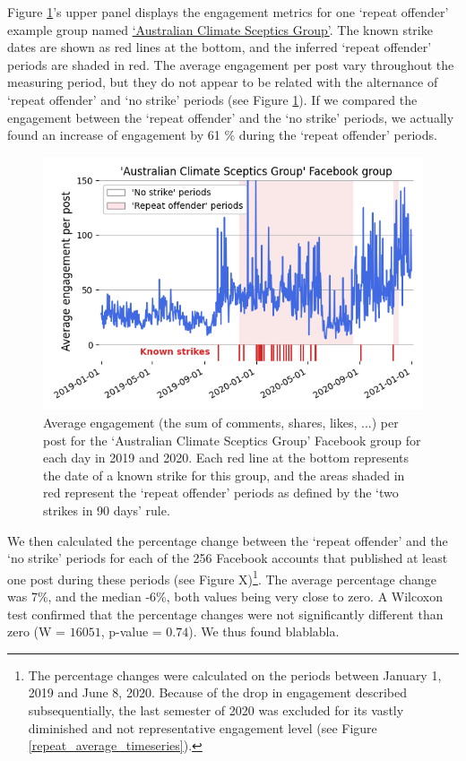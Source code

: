\documentclass[11pt,a4paper]{article}
\begin{document}
Figure \ref{repeat_example_timeseries}'s upper panel displays the engagement metrics for one `repeat offender' example group named \href{https://www.facebook.com/groups/108655705888371/}{`Australian Climate Sceptics Group'}. 
The known strike dates are shown as red lines at the bottom, and the inferred ‘repeat offender’ periods are shaded in red. 
The average engagement per post vary throughout the measuring period, but they do not appear to be related with the alternance of `repeat offender' and `no strike' periods (see Figure \ref{repeat_example_timeseries}).
If we compared the engagement between the `repeat offender' and the `no strike' periods, we actually found an increase of engagement by 61 \% during the `repeat offender' periods.

\begin{figure}[!h]
\centering
\includegraphics[width=\linewidth]{./../figure/repeat_example_timeseries.png}
\caption{Average engagement (the sum of comments, shares, likes, ...) per post for the `Australian Climate Sceptics Group' Facebook group for each day in 2019 and 2020. Each red line at the bottom represents the date of a known strike for this group, and the areas shaded in red represent the `repeat offender' periods as defined by the ‘two strikes in 90 days’ rule.}
\label{repeat_example_timeseries}
\end{figure}

We then calculated the percentage change between the `repeat offender' and the `no strike' periods for each of the 256 Facebook accounts that published at least one post during these periods ({\color{red}see Figure X})\footnote{The percentage changes were calculated on the periods between January 1, 2019 and June 8, 2020. Because of the drop in engagement described subsequentially, the last semester of 2020 was excluded for its vastly diminished and not representative engagement level (see Figure \ref{repeat_average_timeseries}).}.
The average percentage change was 7\%, and the median -6\%, both values being very close to zero. 
A Wilcoxon test confirmed that the percentage changes were not significantly different than zero (W = $16051$, p-value = $0.74$).
We thus found blablabla.
\end{document}
